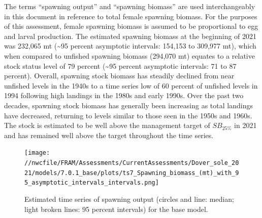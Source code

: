 \documentclass[11pt,
  english,
  a4paper,
]{article}
\begin{document}
\leavevmode\tagmcend\tagstructend


The terms ``spawning output'' and ``spawning biomass'' are used interchangeably in this document in reference to total female spawning biomass. For the purposes of this assessment, female spawning biomass is assumed to be proportional to egg and larval production. The estimated spawning biomass at the beginning of 2021 was 232,065 mt (\textasciitilde95 percent asymptotic intervals: 154,153 to 309,977 mt), which when compared to unfished spawning biomass (294,070 mt) equates to a relative stock status level of 79 percent (\textasciitilde95 percent asymptotic intervals: 71 to 87 percent). Overall, spawning stock biomass has steadily declined from near unfished levels in the 1940s to a time series low of 60 percent of unfished levels in 1994 following high landings in the 1980s and early 1990s. Over the past two decades, spawning stock biomass has generally been increasing as total landings have decreased, returning to levels similar to those seen in the 1950s and 1960s. The stock is estimated to be well above the management target of {\(SB_{25\%}\)\leavevmode\tagmcend\tagstructend} in 2021 and has remained well above the target throughout the time series.

\leavevmode\tagmcend\tagstructend\par




\begin{figure}
\centering
\texttt{[image: //nwcfile/FRAM/Assessments/CurrentAssessments/Dover\_sole\_2021/models/7.0.1\_base/plots/ts7\_Spawning\_biomass\_(mt)\_with\_95\_asymptotic\_intervals\_intervals.png]}
\caption{Estimated time series of spawning output (circles and line: median; light broken lines: 95 percent intervals) for the base model.\label{fig:es-ssb}}
\end{figure}

\tagmcend\tagstructend

\end{document}
